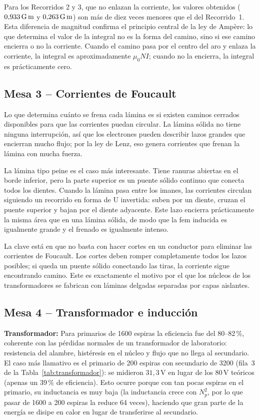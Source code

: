 \documentclass[11pt,twocolumn]{article}
\begin{document}
Para los Recorridos 2 y 3, que no enlazan la corriente, los valores obtenidos ($0{,}933\,\text{G\,m}$ y $0{,}263\,\text{G\,m}$) son m\'as de diez veces menores que el del Recorrido~1. Esta diferencia de magnitud confirma el principio central de la ley de Amp\`ere: lo que determina el valor de la integral no es la forma del camino, sino si ese camino encierra o no la corriente. Cuando el camino pasa por el centro del aro y enlaza la corriente, la integral es aproximadamente $\mu_0 NI$; cuando no la encierra, la integral es pr\'acticamente cero.

\subsection*{Mesa 3 -- Corrientes de Foucault}

Lo que determina cu\'anto se frena cada l\'amina es si existen caminos cerrados disponibles para que las corrientes puedan circular. La l\'amina s\'olida no tiene ninguna interrupci\'on, as\'i que los electrones pueden describir lazos grandes que encierran mucho flujo; por la ley de Lenz, eso genera corrientes que frenan la l\'amina con mucha fuerza.

La l\'amina tipo peine es el caso m\'as interesante. Tiene ranuras abiertas en el borde inferior, pero la parte superior es un puente s\'olido continuo que conecta todos los dientes. Cuando la l\'amina pasa entre los imanes, las corrientes circulan siguiendo un recorrido en forma de U invertida: suben por un diente, cruzan el puente superior y bajan por el diente adyacente. Este lazo encierra pr\'acticamente la misma \'area que en una l\'amina s\'olida, de modo que la fem inducida es igualmente grande y el frenado es igualmente intenso.

La clave est\'a en que no basta con hacer cortes en un conductor para eliminar las corrientes de Foucault. Los cortes deben romper completamente todos los lazos posibles; si queda un puente s\'olido conectando las tiras, la corriente sigue encontrando camino. Este es exactamente el motivo por el que los n\'ucleos de los transformadores se fabrican con l\'aminas delgadas separadas por capas aislantes.

\subsection*{Mesa 4 -- Transformador e inducci\'on}

\textbf{Transformador:} Para primarios de 1600 espiras la eficiencia fue del 80--82\,\%, coherente con las p\'erdidas normales de un transformador de laboratorio: resistencia del alambre, hist\'eresis en el n\'ucleo y flujo que no llega al secundario. El caso m\'as llamativo es el primario de 200 espiras con secundario de 3200 (fila~3 de la Tabla~\ref{tab:transformador}): se midieron $31{,}3\,\text{V}$ en lugar de los 80\,V te\'oricos (apenas un 39\,\% de eficiencia). Esto ocurre porque con tan pocas espiras en el primario, su inductancia es muy baja (la inductancia crece con $N_p^2$, por lo que pasar de 1600 a 200 espiras la reduce 64 veces), haciendo que gran parte de la energ\'ia se disipe en calor en lugar de transferirse al secundario.
\end{document}
